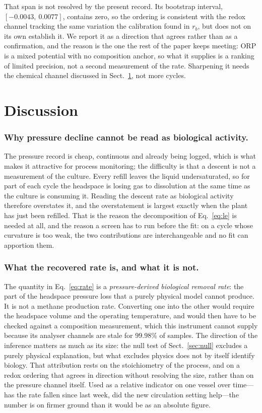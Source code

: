 \documentclass[sigconf]{acmart}
\newcommand{\rb}{\ensuremath{r_{b}}}
\begin{document}
That span is not resolved by the present record. Its bootstrap
interval, $[-0.0043,\ 0.0077]$, contains zero, so the ordering is
consistent with the redox channel tracking the same variation the
calibration found in \rb{}, but does not on its own establish it. We
report it as a direction that agrees rather than as a confirmation, and
the reason is the one the rest of the paper keeps meeting: ORP is a
mixed potential with no composition anchor, so what it supplies is a
ranking of limited precision, not a second measurement of the rate.
Sharpening it needs the chemical channel discussed in
Sect.~\ref{sec:limits}, not more cycles.

\section{Discussion}
\label{sec:limits}

\subsubsection{Why pressure decline cannot be read as biological
activity.}
The pressure record is cheap, continuous and already being logged,
which is what makes it attractive for process monitoring; the
difficulty is that a descent is not a measurement of the culture. Every
refill leaves the liquid undersaturated, so for part of each cycle the
headspace is losing gas to dissolution at the same time as the culture
is consuming it. Reading the descent rate as biological activity
therefore overstates it, and the overstatement is largest exactly when
the plant has just been refilled. That is the reason the decomposition
of Eq.~\eqref{eq:le} is needed at all, and the reason a screen has to
run before the fit: on a cycle whose curvature is too weak, the two
contributions are interchangeable and no fit can apportion them.

\subsubsection{What the recovered rate is, and what it is not.}
The quantity in Eq.~\eqref{eq:rate} is a \emph{pressure-derived
biological removal rate}: the part of the headspace pressure loss that
a purely physical model cannot produce. It is not a methane production
rate. Converting one into the other would require the headspace volume
and the operating temperature, and would then have to be checked
against a composition measurement, which this instrument cannot supply
because its analyser channels are stale for $99.98\%$ of samples. The
direction of the inference matters as much as its size: the null test
of Sect.~\ref{sec:null} excludes a purely physical explanation, but
what excludes physics does not by itself identify biology. That
attribution rests on the stoichiometry of the process, and on a redox
ordering that agrees in direction without resolving the size, rather
than on the pressure channel itself.
Used as a relative indicator on one vessel over time---has the rate
fallen since last week, did the new circulation setting help---the
number is on firmer ground than it would be as an absolute figure.
\end{document}
